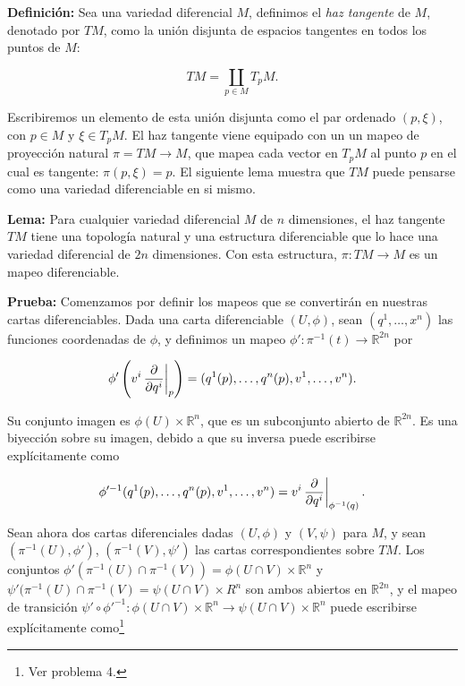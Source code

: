 \documentclass[a4paper,10pt]{article}
\numberwithin{equation}{section}
\newcommand{\zerodel}{.\kern-\nulldelimiterspace}
\newcommand{\definicion}{\textbf{Definición: }}
\newcommand{\lema}{\textbf{Lema: }}
\newcommand{\prueba}{\textbf{Prueba: }}
\begin{document}
\vspace{.3cm}

\definicion Sea una variedad diferencial $M$, definimos el \emph{haz tangente} de 
$M$, denotado por $TM$, como la unión disjunta de espacios tangentes en todos 
los puntos de $M$:

\begin{equation}
 TM = \underset{p \in M}{\coprod} T_p M.
\end{equation}

Escribiremos un elemento de esta unión disjunta como el par ordenado $(p,\xi)$, 
con $p \in M$ y $\xi \in T_pM$. El haz tangente viene equipado con un un mapeo 
de proyección natural $\pi = TM \rightarrow M$, que mapea cada vector en $T_p M$ 
al punto $p$ en el cual es tangente: $\pi(p,\xi) = p$. El siguiente lema 
muestra que $TM$ puede pensarse como una variedad diferenciable en si mismo.

\vspace{.3cm}

\lema Para cualquier variedad diferencial $M$ de $n$ dimensiones, el haz tangente 
$TM$ tiene una topología natural y una estructura diferenciable que lo hace 
una variedad diferencial de $2n$ dimensiones. Con esta estructura, $\pi: TM \rightarrow M$ 
es un mapeo diferenciable.

\vspace{.3cm}

\prueba Comenzamos por definir los mapeos que se convertirán en nuestras cartas 
diferenciables. Dada una carta diferenciable $(U,\phi)$, sean $(q^1,\dots,x^n)$ 
las funciones coordenadas de $\phi$, y definimos un mapeo $\phi': \pi^{-1}(t) \rightarrow \mathbb{R}^{2n}$ 
por 

\begin{equation}
 \phi' \left( v^i \left\zerodel\frac{\partial}{\partial q^i}\right|_p \right) = 
 (q^1(p),\dots,q^n(p),v^1,\dots,v^n).
\end{equation}

Su conjunto imagen es $\phi(U) \times \mathbb{R}^n$, que es un subconjunto abierto 
de $\mathbb{R}^{2n}$. Es una biyección sobre su imagen, debido a que su inversa 
puede escribirse explícitamente como

\begin{equation}
 \phi'^{-1}(q^1(p),\dots,q^n(p),v^1,\dots,v^n) = v^i \left\zerodel\frac{\partial}{\partial q^i}\right|_{\phi^{-1}(q)}.
\end{equation}

Sean ahora dos cartas diferenciales dadas $(U,\phi)$ y $(V,\psi)$ para $M$, y 
sean $(\pi^{-1}(U),\phi')$, $(\pi^{-1}(V),\psi')$ las cartas correspondientes sobre 
$TM$. Los conjuntos $\phi'(\pi^{-1}(U)\cap\pi^{-1}(V)) = \phi(U \cap V) \times \mathbb{R}^n$ 
y $\psi'(\pi^{-1}(U)\cap\pi^{-1}(V) = \psi(U \cap V) \times R^n$ son ambos abiertos 
en $\mathbb{R}^{2n}$, y el mapeo de transición 
$\psi' \circ \phi'^{-1}: \phi(U \cap V) \times \mathbb{R}^n \rightarrow 
\psi(U\cap V)\times \mathbb{R}^n$ puede escribirse explícitamente como\footnote{Ver problema 4.}
\end{document}

